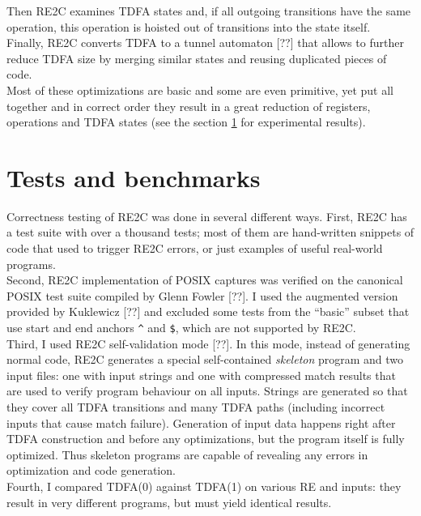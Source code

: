 \documentclass{article}
\theoremstyle{definition}
\begin{document}
\begin{multicols}{2}
Then RE2C examines TDFA states and, if all outgoing transitions have the same operation,
this operation is hoisted out of transitions into the state itself.
\\

Finally, RE2C converts TDFA to a tunnel automaton [??]
that allows to further reduce TDFA size by merging similar states and reusing duplicated pieces of code.
\\

Most of these optimizations are basic and some are even primitive, yet put all together and in correct order
they result in a great reduction of registers, operations and TDFA states
(see the section \ref{section_tests_and_benchmarks} for experimental results).

\section{Tests and benchmarks}\label{section_tests_and_benchmarks}

Correctness testing of RE2C was done in several different ways.
First, RE2C has a test suite with over a thousand tests;
most of them are hand-written snippets of code that used to trigger RE2C errors,
or just examples of useful real-world programs.
\\

Second, RE2C implementation of POSIX captures was verified on the canonical POSIX test suite compiled by Glenn Fowler [??].
I used the augmented version provided by Kuklewicz [??] and excluded some tests from the ``basic'' subset
that use start and end anchors \texttt{\^} and \texttt{\$}, which are not supported by RE2C.
\\

Third, I used RE2C self-validation mode [??].
In this mode, instead of generating normal code, RE2C generates a special self-contained \emph{skeleton} program
and two input files: one with input strings and one with compressed match results
that are used to verify program behaviour on all inputs.
Strings are generated so that they cover all TDFA transitions and many TDFA paths (including incorrect inputs that cause match failure).
Generation of input data happens right after TDFA construction and before any optimizations,
but the program itself is fully optimized.
Thus skeleton programs are capable of revealing any errors in optimization and code generation.
\\

Fourth, I compared TDFA(0) against TDFA(1) on various RE and inputs:
they result in very different programs, but must yield identical results.
\\


\end{multicols}
\end{document}
